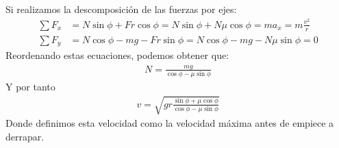 \documentclass{article}
\begin{document}
Si realizamos la descomposición de las fuerzas por ejes:
\begin{equation}
    \begin{split}
        \sum F_{x} &= N \sin \phi + Fr \cos \phi =
        N \sin \phi  + N \mu \cos \phi =m a_{x} = m \frac{v^{2}}{r}\\
        \sum F_{y} &= N \cos \phi  -mg -Fr \sin \phi =
        N \cos \phi  - mg -N \mu  \sin \phi = 0 
    \end{split}
\end{equation}
Reordenando estas ecuaciones, podemos obtener que:
\begin{equation}
    \begin{split}
        N = \frac{mg}{\cos \phi  - \mu \sin \phi }
    \end{split}
\end{equation}
Y por tanto
\begin{equation}
    \begin{split}
        v = \sqrt{gr \frac{\sin \phi  + \mu  \cos \phi }{\cos \phi -\mu \sin \phi }}
    \end{split}
\end{equation}
Donde definimos esta velocidad como la velocidad máxima antes de empiece
a derrapar.
\end{document}
